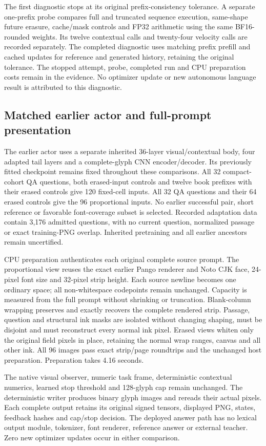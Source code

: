 The first diagnostic stops at its original prefix-consistency tolerance.
A separate one-prefix probe compares full and truncated sequence execution,
same-shape future erasure, cache/mask controls and FP32 arithmetic using the
same BF16-rounded weights. Its twelve contextual calls and twenty-four
velocity calls are recorded separately. The completed diagnostic uses
matching prefix prefill and cached updates for reference and generated
history, retaining the original tolerance. The stopped attempt, probe,
completed run and CPU preparation costs remain in the evidence. No optimizer
update or new autonomous language result is attributed to this diagnostic.

\subsection*{Matched earlier actor and full-prompt presentation}
The earlier actor uses a separate inherited 36-layer visual/contextual body,
four adapted tail layers and a complete-glyph CNN encoder/decoder. Its
previously fitted checkpoint remains fixed throughout these comparisons.
All 32 compact-cohort QA questions, both erased-input controls and twelve
book prefixes with their erased controls give 120 fixed-cell inputs. All
32 QA questions and their 64 erased controls give the 96 proportional inputs.
No earlier successful pair, short reference or favorable font-coverage subset
is selected. Recorded adaptation data contain 3,176 admitted questions, with
no current question, normalized passage or exact training-PNG overlap.
Inherited pretraining and all earlier ancestors remain uncertified.

CPU preparation authenticates each original complete source prompt. The
proportional view reuses the exact earlier Pango renderer and Noto CJK face,
24-pixel font size and 32-pixel strip height. Each source newline becomes one
ordinary space; all non-whitespace codepoints remain unchanged. Capacity is
measured from the full prompt without shrinking or truncation. Blank-column
wrapping preserves and exactly recovers the complete rendered strip. Passage,
question and structural ink masks are isolated without changing shaping,
must be disjoint and must reconstruct every normal ink pixel. Erased views
whiten only the original field pixels in place, retaining the normal wrap
ranges, canvas and all other ink. All 96 images pass exact strip/page
roundtrips and the unchanged host preparation. Preparation takes 4.16 seconds.

The native visual observer, numeric task frame, deterministic contextual
numerics, learned stop threshold and 128-glyph cap remain unchanged. The
deterministic writer produces binary glyph images and rereads their actual
pixels. Each complete output retains its original signed tensors, displayed
PNG, states, feedback hashes and cap/stop decision. The deployed answer path
has no lexical output module, tokenizer, font renderer, reference answer or
external teacher. Zero new optimizer updates occur in either comparison.

